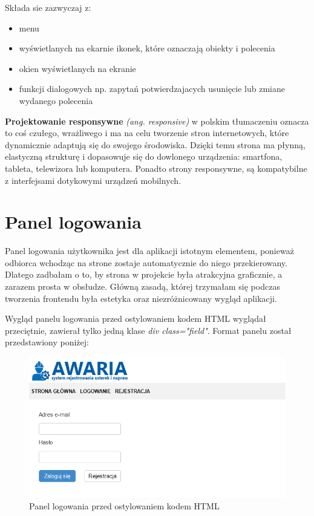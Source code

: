 \documentclass[openright]{xmgr}
\begin{document}
Składa sie zazwyczaj z:\\
	
\begin{itemize}
	\item
	menu
	
	\item
	 wyświetlanych na ekarnie ikonek, które oznaczają obiekty i polecenia
	
	\item
	okien wyświetlanych na ekranie
	\item
	funkcji dialogowych np. zapytań potwierdzajacych usunięcie lub zmiane wydanego polecenia
\end{itemize}
	
	\textbf{Projektowanie responsywne} \textit{(ang. responsive)} \cite{framework} w polskim tłumaczeniu oznacza to coś czułego, wrażliwego i ma na celu tworzenie stron internetowych, które dynamicznie adaptują się do swojego środowiska. Dzięki temu strona ma płynną, elastyczną strukturę i dopasowuje się do dowlonego urządzenia: smartfona, tableta, telewizora lub komputera. Ponadto strony responsywne, są kompatybilne z interfejsami dotykowymi urządzeń mobilnych. 
	\newpage
	\section{Panel logowania}
	
	Panel logowania użytkownika jest dla aplikacji istotnym elementem, ponieważ odbiorca wchodząc na strone zostaje automatycznie do niego przekierowany. Dlatego zadbałam o to, by strona w projekcie była atrakcyjna graficznie, a zarazem prosta w obsłudze. Główną zasadą, której trzymałam się podczas tworzenia frontendu była estetyka oraz niezróżnicowany wygląd aplikacji.  
	
	Wygląd panelu logowania przed ostylowaniem kodem HTML wyglądał przeciętnie, zawierał tylko jedną klase \textit{div class="field"}. Format panelu został przedstawiony poniżej:
	
	\begin{figure}[!tbh]
		\centering
		\includegraphics[width=\linewidth]{image/panel}
		\caption{Panel logowania przed ostylowaniem kodem HTML}
	\end{figure}
	
\end{document}
